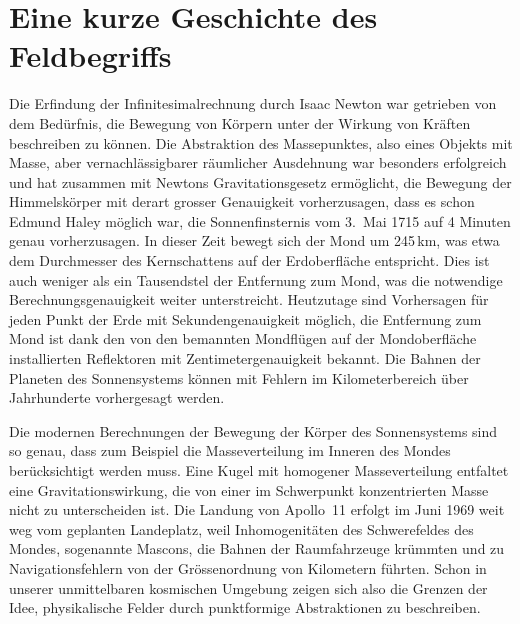 %
%
%
\section{Eine kurze Geschichte des Feldbegriffs}
Die Erfindung der Infinitesimalrechnung durch Isaac Newton war getrieben
%
von dem Bedürfnis, die Bewegung von Körpern unter der Wirkung von
Kräften beschreiben zu können.
Die Abstraktion des Massepunktes, also eines Objekts mit Masse,
%
aber vernachlässigbarer räumlicher Ausdehnung war besonders erfolgreich
und hat zusammen mit Newtons Gravitationsgesetz ermöglicht, die
%
Bewegung der Himmelskörper mit derart grosser Genauigkeit vorherzusagen,
dass es schon Edmund Haley möglich war, die Sonnenfinsternis vom
3.~Mai 1715 auf 4 Minuten genau vorherzusagen.
%
In dieser Zeit bewegt sich der Mond um 245\,km, was etwa dem Durchmesser
des Kernschattens auf der Erdoberfläche entspricht.
%
Dies ist auch weniger als ein Tausendstel der Entfernung zum Mond,
was die notwendige Berechnungsgenauigkeit weiter unterstreicht.
Heutzutage sind Vorhersagen für jeden Punkt der Erde mit
Sekundengenauigkeit möglich, die Entfernung zum Mond ist dank den
von den bemannten Mondflügen auf der Mondoberfläche installierten
Reflektoren mit Zentimetergenauigkeit bekannt.
Die Bahnen der Planeten des Sonnensystems können mit Fehlern im
Kilometerbereich über Jahrhunderte vorhergesagt werden.

Die modernen Berechnungen der Bewegung der Körper des Sonnensystems
sind so genau, dass zum Beispiel die Masseverteilung im Inneren des
Mondes berücksichtigt werden muss.
%
Eine Kugel mit homogener Masseverteilung entfaltet eine
Gravitationswirkung, die von einer im Schwerpunkt konzentrierten
Masse nicht zu unterscheiden ist.
Die Landung von Apollo~11 erfolgt im Juni 1969 weit weg vom geplanten
%
Landeplatz, weil Inhomogenitäten des Schwerefeldes des Mondes,
sogenannte Mascons, die Bahnen der Raumfahrzeuge krümmten und zu
%
Navigationsfehlern von der Grössenordnung von Kilometern führten.
Schon in unserer unmittelbaren kosmischen Umgebung zeigen sich also die
Grenzen der Idee, physikalische Felder durch punktformige Abstraktionen zu
beschreiben.

